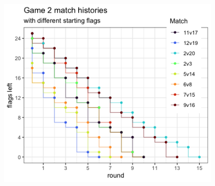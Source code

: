\documentclass[addpoints ]{exam}
\begin{document}
\begin{questions}
\begin{figure}[!h]
  \centering
  \includegraphics[width=.6\linewidth]{figures/Game2.png} 
\end{figure}



\end{questions}
\end{document}
